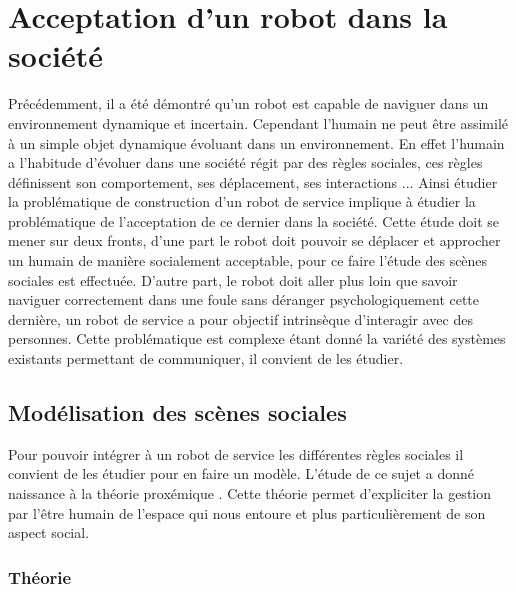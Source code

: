 \section[Interactions]{Acceptation d'un robot dans la société}

Précédemment, il a été démontré qu'un robot est capable de naviguer dans un environnement dynamique et incertain. Cependant l'humain ne peut être assimilé à un simple objet dynamique évoluant dans un environnement. En effet l'humain a l'habitude d'évoluer dans une société régit par des règles sociales, ces règles définissent son comportement, ses déplacement, ses interactions ... Ainsi étudier la problématique de construction d'un robot de service implique à étudier la problématique de l'acceptation de ce dernier dans la société. Cette étude doit se mener sur deux fronts, d'une part le robot doit pouvoir se déplacer et approcher un humain de manière socialement acceptable, pour ce faire l'étude des scènes sociales est effectuée. D'autre part, le robot doit aller plus loin que savoir naviguer correctement dans une foule sans déranger psychologiquement cette dernière, un robot de service a pour objectif intrinsèque d'interagir avec des personnes. Cette problématique est complexe étant donné la variété des systèmes existants permettant de communiquer, il convient de les étudier.

\subsection{Modélisation des scènes sociales}
\label{subsec:social}

Pour pouvoir intégrer à un robot de service les différentes règles sociales il convient de les étudier pour en faire un modèle. L'étude de ce sujet a donné naissance à la théorie proxémique \cite{hall_hidden_1996}. Cette théorie permet d'expliciter la gestion par l'être humain de l'espace qui nous entoure et plus particulièrement de son aspect social.

\subsubsection{Théorie}

